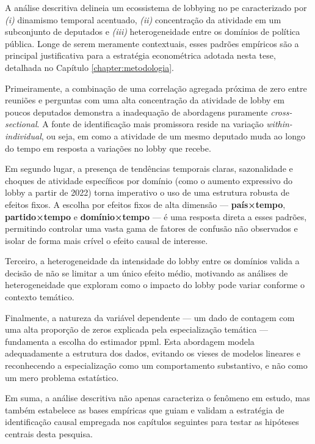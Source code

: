 A análise descritiva delineia um ecossistema de lobbying no \acrshort{pe} caracterizado por \textit{(i)} dinamismo temporal acentuado, \textit{(ii)} concentração da atividade em um subconjunto de deputados e \textit{(iii)} heterogeneidade entre os domínios de política pública. Longe de serem meramente contextuais, esses padrões empíricos são a principal justificativa para a estratégia econométrica adotada nesta tese, detalhada no Capítulo \ref{chapter:metodologia}.

Primeiramente, a combinação de uma correlação agregada próxima de zero entre reuniões e perguntas com uma alta concentração da atividade de lobby em poucos deputados demonstra a inadequação de abordagens puramente \textit{cross-sectional}. A fonte de identificação mais promissora reside na variação \textit{within-individual}, ou seja, em como a atividade de um mesmo deputado muda ao longo do tempo em resposta a variações no lobby que recebe.

Em segundo lugar, a presença de tendências temporais claras, sazonalidade e choques de atividade específicos por domínio (como o aumento expressivo do lobby a partir de 2022) torna imperativo o uso de uma estrutura robusta de efeitos fixos. A escolha por efeitos fixos de alta dimensão — \textbf{país×tempo}, \textbf{partido×tempo} e \textbf{domínio×tempo} — é uma resposta direta a esses padrões, permitindo controlar uma vasta gama de fatores de confusão não observados e isolar de forma mais crível o efeito causal de interesse.

Terceiro, a heterogeneidade da intensidade do lobby entre os domínios valida a decisão de não se limitar a um único efeito médio, motivando as análises de heterogeneidade que exploram como o impacto do lobby pode variar conforme o contexto temático.

Finalmente, a natureza da variável dependente — um dado de contagem com uma alta proporção de zeros explicada pela especialização temática — fundamenta a escolha do estimador \acrshort{ppml}. Esta abordagem modela adequadamente a estrutura dos dados, evitando os vieses de modelos lineares e reconhecendo a especialização como um comportamento substantivo, e não como um mero problema estatístico.

Em suma, a análise descritiva não apenas caracteriza o fenômeno em estudo, mas também estabelece as bases empíricas que guiam e validam a estratégia de identificação causal empregada nos capítulos seguintes para testar as hipóteses centrais desta pesquisa.

